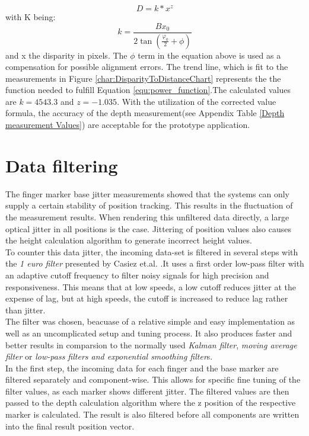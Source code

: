 \begin{equation}
\label{equ:power_function}
D=k*x^{z}
\end{equation}
with K being:
\begin{equation}
k=\frac{Bx_0}{2\tan(\frac{\varphi_0}{2}+\phi)}
\end{equation}
and x the disparity in pixels.
The $\phi$ term in the equation above is used as a compensation for possible alignment errors.
The trend line, which is fit to the measurements in Figure \ref{char:DisparityToDistanceChart} represents the the function needed to fulfill Equation \ref{equ:power_function}.The calculated values are $k=4543.3$ and $z=-1.035$.
With the utilization of the corrected value formula, the accuracy of the depth measurement(see Appendix Table \ref{Depth measurement Values}) are acceptable for the prototype application.
\section{Data filtering}
The finger marker base jitter measurements showed that the systems can only supply a certain stability of position tracking. This results in the fluctuation of the measurement results. When rendering this unfiltered data directly, a large optical jitter in all positions is the case. Jittering of position values also causes the height calculation algorithm to generate incorrect height values.\\
To counter this data jitter, the incoming data-set is filtered in several steps with the \textit{1 euro filter} presented by Casiez et.al. \cite{Casiez.2012}.It uses a first order low-pass filter with an adaptive cutoff frequency to filter noisy signals for high precision and responsiveness. This means that at low speeds, a low cutoff reduces jitter at the expense of lag, but at high speeds, the cutoff is increased to reduce lag rather than jitter.\\
\newpage The filter was chosen, beacuase of a relative simple and easy implementation as well as an uncomplicated setup and tuning process. It also produces faster and better results in comparsion to the normally used \textit{Kalman filter}\cite{Welch.2001}, \textit{moving average filter} or \textit{low-pass filters and exponential smoothing filter}s\cite{LaViola.2003}.
\\ In the first step, the incoming data for each finger and the base marker  are filtered separately and component-wise. This allows for specific fine tuning of the filter values, as each marker shows different jitter. The filtered values are then passed to the depth calculation algorithm where the z position of the respective marker is calculated. The result is also filtered before all components are written into the final result position vector.
